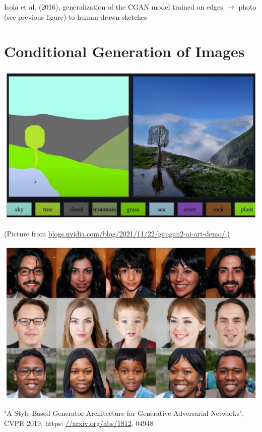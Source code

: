 \documentclass[10pt]{article}
\begin{document}
Isola et al. (2016), generalization of the CGAN model trained on edges $\mapsto$ photo (see previous figure) to human-drawn sketches

\section*{Conditional Generation of Images}
\begin{center}
\includegraphics[max width=\textwidth]{2024_01_08_a381fc3992661ee7020eg-11(1)}
\end{center}

(Picture from \href{http://blogs.nvidia.com/blog/2021/11/22/gaugan2-ai-art-demo/.)}{blogs.nvidia.com/blog/2021/11/22/gaugan2-ai-art-demo/.)}

\begin{center}
\includegraphics[max width=\textwidth]{2024_01_08_a381fc3992661ee7020eg-11}
\end{center}

"A Style-Based Generator Architecture for Generative Adversarial Networks", CVPR 2019, https: \href{//arxiv.org/abs/1812}{//arxiv.org/abs/1812}. 04948
\end{document}
